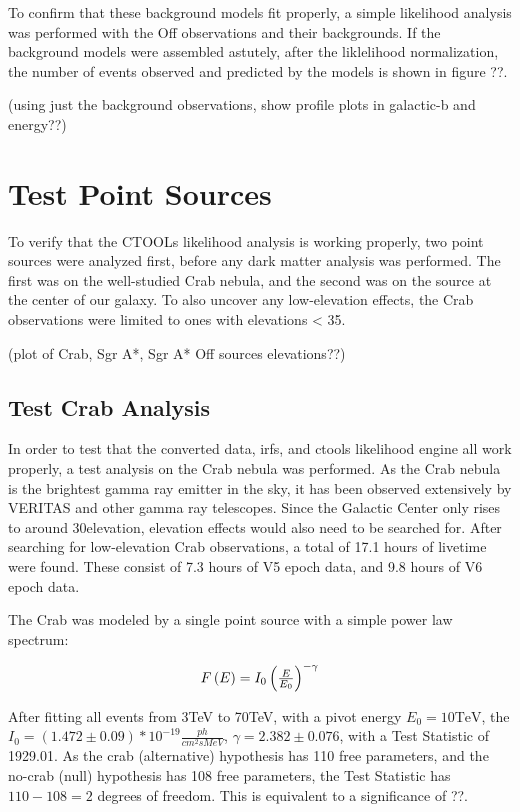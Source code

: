   To confirm that these background models fit properly, a simple likelihood analysis was performed with the Off observations and their backgrounds.
  If the background models were assembled astutely, after the liklelihood normalization, the number of events observed and predicted by the models is shown in figure ??.

  (using just the background observations, show profile plots in galactic-b and energy??)

\section{Test Point Sources}
  To verify that the CTOOLs likelihood analysis is working properly, two point sources were analyzed first, before any dark matter analysis was performed.
  The first was on the well-studied Crab nebula, and the second was on the source at the center of our galaxy.
  To also uncover any low-elevation effects, the Crab observations were limited to ones with elevations < 35\degree.

  (plot of Crab, Sgr A*, Sgr A* Off sources elevations??)

  \subsection{Test Crab Analysis}

    In order to test that the converted data, irfs, and ctools likelihood engine all work properly, a test analysis on the Crab nebula was performed.
    As the Crab nebula is the brightest gamma ray emitter in the sky, it has been observed extensively by VERITAS and other gamma ray telescopes.
    Since the Galactic Center only rises to around 30\degree elevation, elevation effects would also need to be searched for.
    After searching for low-elevation Crab observations, a total of 17.1 hours of livetime were found.
    These consist of 7.3 hours of V5 epoch data, and 9.8 hours of V6 epoch data.

    The Crab was modeled by a single point source with a simple power law spectrum:

    \begin{equation} \label{eqn:powerlaw}
    $$  F\left( E \right) = I_{0} \left( \frac{E}{E_{0}} \right)^{-\gamma} $$
    \end{equation}

    After fitting all events from 3TeV to 70TeV, with a pivot energy $ E_{0}= 10\text{TeV} $, the $ I_{0} = \left(1.472\pm0.09\right)*10^{-19} \frac{ph}{cm^{2} s MeV} $, $ \gamma = 2.382 \pm 0.076 $, with a Test Statistic of 1929.01.
    As the crab (alternative) hypothesis has 110 free parameters, and the no-crab (null) hypothesis has 108 free parameters, the Test Statistic has $ 110 - 108 = 2 $ degrees of freedom.
    This is equivalent to a significance of ??.
    
